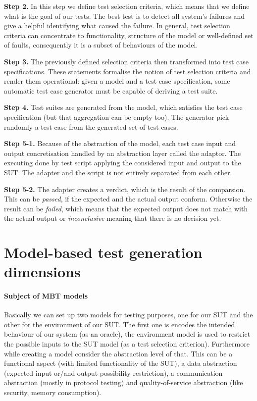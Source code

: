 \textbf{Step 2.}
In this step we define test selection criteria, which means that we define what is the goal of our tests. The best test is to detect all system's failures and give a helpful identifying what caused the failure. In general, test selection criteria can concentrate to functionality, structure of the model or well-defined set of faults, consequently it is a subset of behaviours of the model.

\textbf{Step 3.}
The previously defined selection criteria then transformed into test case specifications. These statements formalise the notion of test selection criteria and render them operational: given a model and a test case specification, some automatic test case generator must be capable of deriving a test suite.

\textbf{Step 4.}
Test suites are generated from the model, which satisfies the test case specification (but that aggregation can be empty too). The generator pick randomly a test case from the generated set of test cases.

\textbf{Step 5-1.}
Because of the abstraction of the model, each test case input and output concretisation handled by an abstraction layer called the adaptor. The executing done by test script applying the considered input and output to the SUT. The adapter and the script is not entirely separated from each other.

\textbf{Step 5-2.}
The adapter creates a verdict, which is the result of the comparsion. This can be \textit{passed}, if the expected and the actual output conform. Otherwise the result can be \textit{failed}, which means that the expected output does not match with the actual output or \textit{inconclusive} meaning that there is no decision yet.

\section{Model-based test generation dimensions}
\paragraph{Subject of MBT models}
Basically we can set up two models for testing purposes, one for our SUT and the other for the environment of our SUT. The first one is encodes the intended behaviour of our system (as an oracle), the environment model is used to restrict the possible inputs to the SUT model (as a test selection criterion). Furthermore while creating a model consider the abstraction level of that. This can be a functional aspect (with limited functionality of the SUT), a data abstraction (expected input or/and output possibility restriction), a communication abstraction (mostly in protocol testing) and quality-of-service abstraction (like security, memory consumption).

